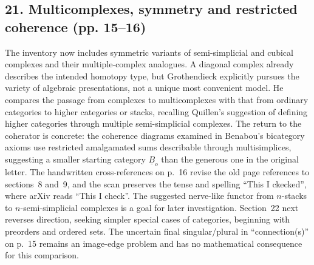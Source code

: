 \subsection*{21. Multicomplexes, symmetry and restricted coherence (pp. 15--16)}
The inventory now includes symmetric variants of semi-simplicial and cubical complexes and their multiple-complex analogues. A diagonal complex already describes the intended homotopy type, but Grothendieck explicitly pursues the variety of algebraic presentations, not a unique most convenient model. He compares the passage from complexes to multicomplexes with that from ordinary categories to higher categories or stacks, recalling Quillen's suggestion of defining higher categories through multiple semi-simplicial complexes. The return to the coherator is concrete: the coherence diagrams examined in Benabou's bicategory axioms use restricted amalgamated sums describable through multisimplices, suggesting a smaller starting category $\underline B_o$ than the generous one in the original letter. The handwritten cross-references on p.~16 revise the old page references to sections~8 and~9, and the scan preserves the tense and spelling ``This I ckecked'', where arXiv reads ``This I check''. The suggested nerve-like functor from $n$-stacks to $n$-semi-simplicial complexes is a goal for later investigation. Section~22 next reverses direction, seeking simpler special cases of categories, beginning with preorders and ordered sets. The uncertain final singular/plural in ``connection(s)'' on p.~15 remains an image-edge problem and has no mathematical consequence for this comparison.

